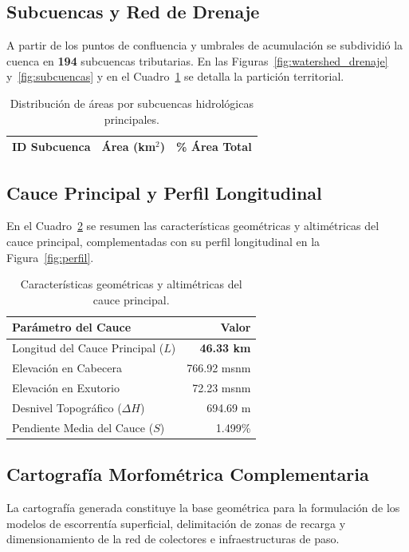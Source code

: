 \documentclass[11pt,a4paper]{article}
\begin{document}
\subsection{Subcuencas y Red de Drenaje}
A partir de los puntos de confluencia y umbrales de acumulación se subdividió la cuenca en \textbf{194} subcuencas tributarias. En las Figuras~\ref{fig:watershed_drenaje} y~\ref{fig:subcuencas} y en el Cuadro~\ref{tab:subcuencas} se detalla la partición territorial.





\begin{table}[H]
\centering
\caption{Distribución de áreas por subcuencas hidrológicas principales.}
\label{tab:subcuencas}
\begin{tabular}{rrr}\toprule
\textbf{ID Subcuenca} & \textbf{Área (km$^2$)} & \textbf{\% Área Total} \\\midrule

\bottomrule
\end{tabular}
\end{table}

\subsection{Cauce Principal y Perfil Longitudinal}
En el Cuadro~\ref{tab:cauce} se resumen las características geométricas y altimétricas del cauce principal, complementadas con su perfil longitudinal en la Figura~\ref{fig:perfil}.

\begin{table}[H]
\centering
\caption{Características geométricas y altimétricas del cauce principal.}
\label{tab:cauce}
\begin{tabular}{p{8.5cm}r}\toprule
\textbf{Parámetro del Cauce} & \textbf{Valor} \\\midrule
Longitud del Cauce Principal ($L$) & \textbf{46.33 km} \\
Elevación en Cabecera & 766.92 msnm \\
Elevación en Exutorio & 72.23 msnm \\
Desnivel Topográfico ($\Delta H$) & 694.69 m \\
Pendiente Media del Cauce ($S$) & 1.499\% \\
\bottomrule
\end{tabular}
\end{table}



\subsection{Cartografía Morfométrica Complementaria}
La cartografía generada constituye la base geométrica para la formulación de los modelos de escorrentía superficial, delimitación de zonas de recarga y dimensionamiento de la red de colectores e infraestructuras de paso.
\end{document}
